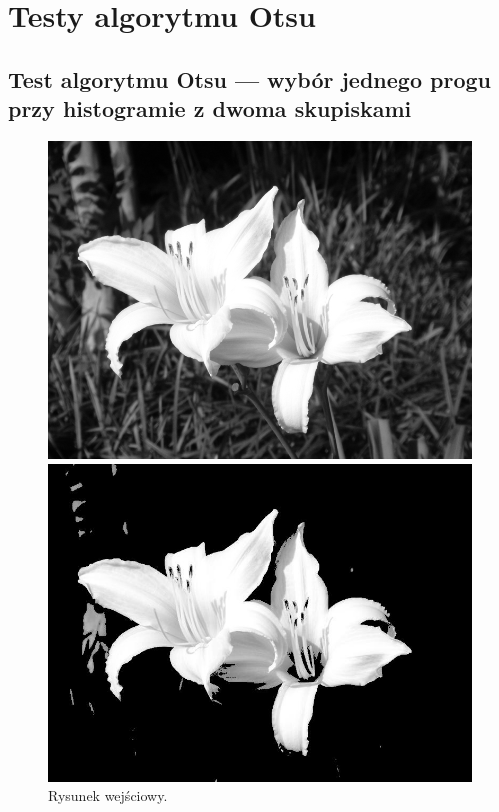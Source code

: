 \documentclass[10pt]{llncs}
\begin{document}
\newpage
\section{Testy algorytmu Otsu}

\subsection{Test algorytmu Otsu --- wybór jednego progu przy histogramie z dwoma skupiskami}

\begin{figure}[!htb]
  \includegraphics[width=\linewidth]{img/01.jpg}
  \caption{Rysunek wejściowy.}\label{fig:1}
\endminipage\hfill
{}
  \includegraphics[width=\linewidth]{img/01_region_01.jpg}

\end{figure}
\end{document}
